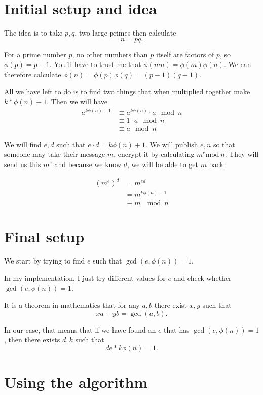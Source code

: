 \documentclass{article} \usepackage{amsmath} \usepackage[utf8]{inputenc}
\begin{document}
\section{Initial setup and idea}
 The idea is to take $p,q$, two large primes then calculate \[n = pq.\]

 For a prime number $p$, no other numbers than $p$ itself are factors of $p$, so
 $\phi(p) = p-1$. You'll have to trust me that $\phi(mn) = \phi(m)\phi(n)$. We
 can therefore calculate $\phi(n) = \phi(p)\phi(q) = (p-1)(q-1)$.
 

 All we have left to do is to find two things that when multiplied together make
 $k*\phi(n) + 1$. Then we will have
\begin{align}
    a^{k\phi(n) + 1} &\equiv a^{k\phi(n)}\cdot a \mod{n} \\ &\equiv 1 \cdot a
    \mod{n} \\ &\equiv a \mod{n}
\end{align}

We will find $e,d$ such that $e\cdot d = k\phi(n) + 1$. We will publish $e,n$ so
that someone may take their message $m$, encrypt it by calculating $m^e
\mathrm{mod}\ n$. They will send us this $m^e$ and because we know $d$, we will
be able to get $m$ back:

\begin{align}
    (m^e)^d &= m^{ed} \\ &= m^{k\phi(n) + 1} \\ &\equiv m\ \mod{n}
\end{align}

\section{Final setup}

 We start by trying to find $e$ such that $\gcd(e,\phi(n)) = 1$.
 
In my implementation, I just try different values for $e$ and check whether
$\gcd(e, \phi(n)) = 1$.

It is a theorem in mathematics that for any $a, b$ there exist $x, y$ such that
\[xa + yb = \gcd(a,b).\]

In our case, that means that if we have found an $e$ that has $\gcd(e, \phi(n))
= 1$, then there exists $d,k$ such that
\[de * k\phi(n) = 1.\]

\section{Using the algorithm}
\end{document}
